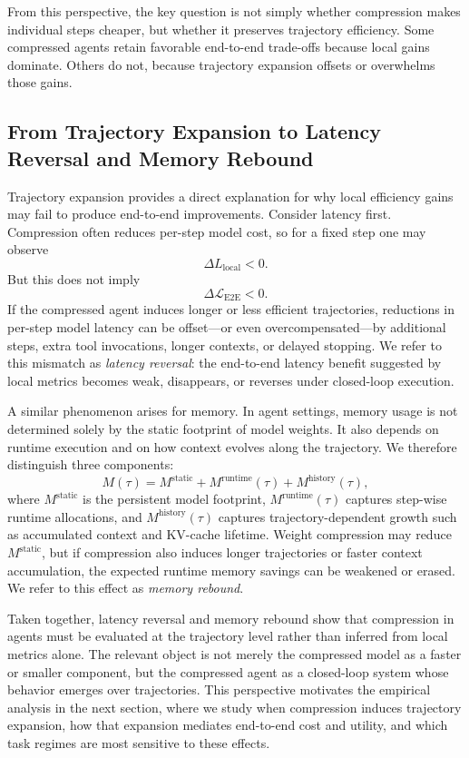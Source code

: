 \documentclass{article}
\begin{document}
From this perspective, the key question is not simply whether compression makes individual steps cheaper, but whether it preserves trajectory efficiency. Some compressed agents retain favorable end-to-end trade-offs because local gains dominate. Others do not, because trajectory expansion offsets or overwhelms those gains.

\subsection{From Trajectory Expansion to Latency Reversal and Memory Rebound}

Trajectory expansion provides a direct explanation for why local efficiency gains may fail to produce end-to-end improvements. Consider latency first. Compression often reduces per-step model cost, so for a fixed step one may observe
\[
\Delta L_{\mathrm{local}} < 0.
\]
But this does not imply
\[
\Delta \mathcal{L}_{\mathrm{E2E}} < 0.
\]
If the compressed agent induces longer or less efficient trajectories, reductions in per-step model latency can be offset---or even overcompensated---by additional steps, extra tool invocations, longer contexts, or delayed stopping. We refer to this mismatch as \emph{latency reversal}: the end-to-end latency benefit suggested by local metrics becomes weak, disappears, or reverses under closed-loop execution.

A similar phenomenon arises for memory. In agent settings, memory usage is not determined solely by the static footprint of model weights. It also depends on runtime execution and on how context evolves along the trajectory. We therefore distinguish three components:
\[
M(\tau) = M^{\mathrm{static}} + M^{\mathrm{runtime}}(\tau) + M^{\mathrm{history}}(\tau),
\]
where $M^{\mathrm{static}}$ is the persistent model footprint, $M^{\mathrm{runtime}}(\tau)$ captures step-wise runtime allocations, and $M^{\mathrm{history}}(\tau)$ captures trajectory-dependent growth such as accumulated context and KV-cache lifetime. Weight compression may reduce $M^{\mathrm{static}}$, but if compression also induces longer trajectories or faster context accumulation, the expected runtime memory savings can be weakened or erased. We refer to this effect as \emph{memory rebound}.

Taken together, latency reversal and memory rebound show that compression in agents must be evaluated at the trajectory level rather than inferred from local metrics alone. The relevant object is not merely the compressed model as a faster or smaller component, but the compressed agent as a closed-loop system whose behavior emerges over trajectories. This perspective motivates the empirical analysis in the next section, where we study when compression induces trajectory expansion, how that expansion mediates end-to-end cost and utility, and which task regimes are most sensitive to these effects.
\end{document}
